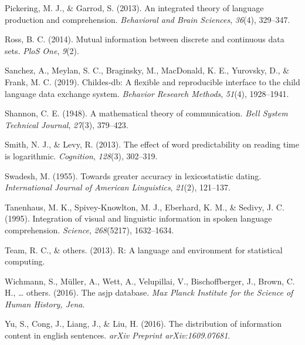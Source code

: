 \documentclass[man,floatsintext]{apa6}
\begin{document}
\leavevmode\hypertarget{ref-pickering2013}{}%
Pickering, M. J., \& Garrod, S. (2013). An integrated theory of language production and comprehension. \emph{Behavioral and Brain Sciences}, \emph{36}(4), 329--347.

\leavevmode\hypertarget{ref-ross2014}{}%
Ross, B. C. (2014). Mutual information between discrete and continuous data sets. \emph{PloS One}, \emph{9}(2).

\leavevmode\hypertarget{ref-sanchez2019}{}%
Sanchez, A., Meylan, S. C., Braginsky, M., MacDonald, K. E., Yurovsky, D., \& Frank, M. C. (2019). Childes-db: A flexible and reproducible interface to the child language data exchange system. \emph{Behavior Research Methods}, \emph{51}(4), 1928--1941.

\leavevmode\hypertarget{ref-shannon1948}{}%
Shannon, C. E. (1948). A mathematical theory of communication. \emph{Bell System Technical Journal}, \emph{27}(3), 379--423.

\leavevmode\hypertarget{ref-smith2013}{}%
Smith, N. J., \& Levy, R. (2013). The effect of word predictability on reading time is logarithmic. \emph{Cognition}, \emph{128}(3), 302--319.

\leavevmode\hypertarget{ref-swadesh1955}{}%
Swadesh, M. (1955). Towards greater accuracy in lexicostatistic dating. \emph{International Journal of American Linguistics}, \emph{21}(2), 121--137.

\leavevmode\hypertarget{ref-tanenhaus1995}{}%
Tanenhaus, M. K., Spivey-Knowlton, M. J., Eberhard, K. M., \& Sedivy, J. C. (1995). Integration of visual and linguistic information in spoken language comprehension. \emph{Science}, \emph{268}(5217), 1632--1634.

\leavevmode\hypertarget{ref-team2013}{}%
Team, R. C., \& others. (2013). R: A language and environment for statistical computing.

\leavevmode\hypertarget{ref-wichmann2016}{}%
Wichmann, S., Müller, A., Wett, A., Velupillai, V., Bischoffberger, J., Brown, C. H., \ldots{} others. (2016). The asjp database. \emph{Max Planck Institute for the Science of Human History, Jena}.

\leavevmode\hypertarget{ref-yu2016}{}%
Yu, S., Cong, J., Liang, J., \& Liu, H. (2016). The distribution of information content in english sentences. \emph{arXiv Preprint arXiv:1609.07681}.

\endgroup
\end{document}
